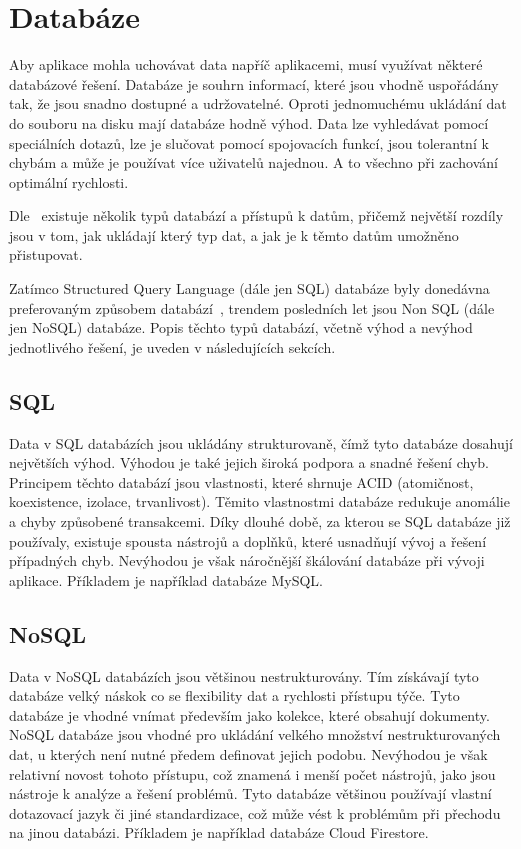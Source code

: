 \section{Databáze}

Aby aplikace mohla uchovávat data napříč aplikacemi,
musí využívat některé databázové řešení.
Databáze je souhrn informací,
které jsou vhodně uspořádány tak,
že jsou snadno dostupné a udržovatelné.
Oproti jednomuchému ukládání dat do souboru na disku mají databáze hodně výhod.
Data lze vyhledávat pomocí speciálních dotazů,
lze je slučovat pomocí spojovacích funkcí,
jsou tolerantní k chybám
a může je používat více uživatelů najednou.
A to všechno při zachování optimální rychlosti.~\cite{database}

Dle~\cite{sql_nosql} existuje několik typů databází a přístupů k datům,
přičemž největší rozdíly jsou v tom,
jak ukládají který typ dat,
a jak je k těmto datům umožněno přistupovat.
~\cite{sql_nosql}

Zatímco Structured Query Language (dále jen SQL) databáze byly donedávna
preferovaným způsobem databází~\cite{sql_nosql},
trendem posledních let jsou Non SQL (dále jen NoSQL) databáze.
Popis těchto typů databází,
včetně výhod a nevýhod jednotlivého řešení,
je uveden v následujících sekcích.

\subsection{SQL}

Data v SQL databázích jsou ukládány strukturovaně,
čímž tyto databáze dosahují největších výhod.
Výhodou je také jejich široká podpora a snadné řešení chyb.
Principem těchto databází jsou vlastnosti,
které shrnuje ACID (atomičnost, koexistence, izolace, trvanlivost).
Těmito vlastnostmi databáze redukuje anomálie a chyby způsobené transakcemi.
Díky dlouhé době,
za kterou se SQL databáze již používaly,
existuje spousta nástrojů a doplňků,
které usnadňují vývoj a řešení případných chyb.
Nevýhodou je však náročnější škálování databáze při vývoji aplikace.
Příkladem je například databáze MySQL.~\cite{sql_nosql}

\subsection{NoSQL}

Data v NoSQL databázích jsou většinou nestrukturovány.
Tím získávají tyto databáze velký náskok co se flexibility dat a rychlosti
přístupu týče.
Tyto databáze je vhodné vnímat především jako kolekce,
které obsahují dokumenty. 
NoSQL databáze jsou vhodné pro ukládání velkého množství nestrukturovaných dat,
u kterých není nutné předem definovat jejich podobu.
Nevýhodou je však relativní novost tohoto přístupu,
což znamená i menší počet nástrojů,
jako jsou nástroje k analýze a řešení problémů.
Tyto databáze většinou používají vlastní dotazovací jazyk či jiné standardizace,
což může vést k problémům při přechodu na jinou databázi.
\cite{sql_nosql}
Příkladem je například databáze Cloud Firestore.
\cite{cloud_firestore}

